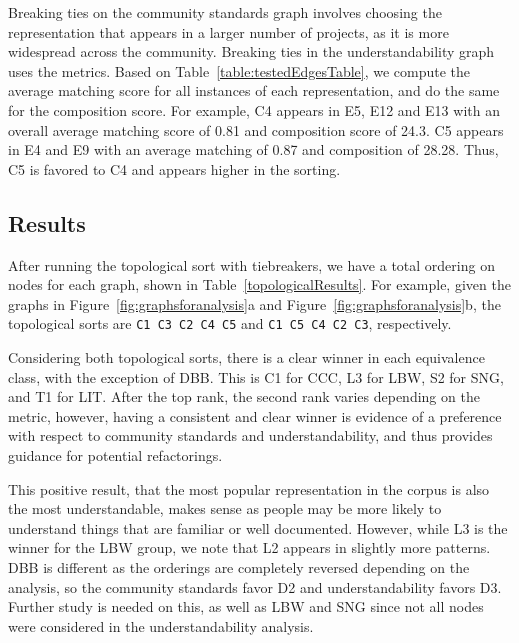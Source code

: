Breaking ties on the community standards graph involves choosing the representation that appears in a larger number of projects, as it is more widespread across the community. 
Breaking ties in the understandability graph uses the metrics. Based on Table~\ref{table:testedEdgesTable}, we compute the average matching score for all instances of each representation, and do the same for the composition score. For example, C4 appears in E5, E12 and E13 with an overall average matching score of 0.81 and composition score of 24.3. C5 appears in E4 and E9 with an average matching of 0.87 and composition of 28.28. Thus, C5 is favored to C4 and appears higher in the sorting.

\subsection{Results}
After running the topological sort with tiebreakers, we have a total ordering on nodes for each graph, shown in Table~\ref{topologicalResults}.  For example, given the graphs in Figure~\ref{fig:graphsforanalysis}a and Figure~\ref{fig:graphsforanalysis}b, the topological sorts are {\tt C1 C3 C2 C4 C5} and {\tt C1 C5 C4 C2 C3}, respectively.



Considering both topological sorts, there is a clear winner in each equivalence class, with the exception of DBB.
This is C1 for CCC, L3 for LBW, S2 for SNG, and T1 for LIT.
After the top rank, the second rank varies depending on the metric, however, having a consistent and clear winner is evidence of a preference with respect to community standards and understandability, and thus provides guidance for potential refactorings.

This positive result, that the most popular representation in the corpus is also the most understandable, makes sense as people may be more likely to understand things that are familiar or well documented. However, while L3 is the winner for the LBW group, we note that L2 appears in slightly more patterns.
DBB is different  as the orderings are completely reversed depending on the analysis, so the community standards favor D2 and understandability favors D3. Further study is needed on this, as well as  LBW and SNG since not all nodes were considered in the understandability analysis. 


